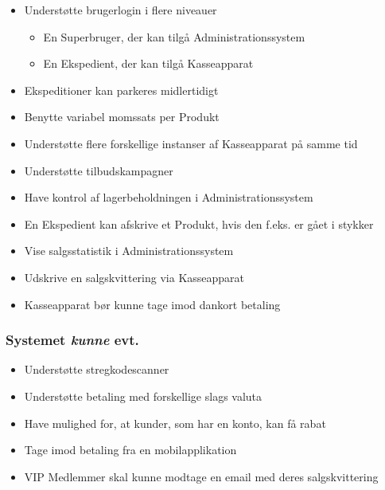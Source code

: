 \begin{itemize}

\item Understøtte brugerlogin i flere niveauer
\begin{itemize}
\item En Superbruger, der kan tilgå Administrationssystem\\
\item En Ekspedient, der kan tilgå Kasseapparat
\end{itemize}
\item Ekspeditioner kan parkeres midlertidigt
\item Benytte variabel momssats per Produkt
\item Understøtte flere forskellige instanser af Kasseapparat på samme tid
\item Understøtte tilbudskampagner
\item Have kontrol af lagerbeholdningen i Administrationssystem
\item En Ekspedient kan afskrive et Produkt, hvis den f.eks. er gået i stykker
\item Vise salgsstatistik i Administrationssystem
\item Udskrive en salgskvittering via Kasseapparat
\item Kasseapparat bør kunne tage imod dankort betaling

\end{itemize}


\subsubsection*{Systemet \textit{kunne} evt.}

\begin{itemize}

\item Understøtte stregkodescanner
\item Understøtte betaling med forskellige slags valuta
\item Have mulighed for, at kunder, som har en konto, kan få rabat
\item Tage imod betaling fra en mobilapplikation
\item VIP Medlemmer skal kunne modtage en email med deres salgskvittering

\end{itemize}